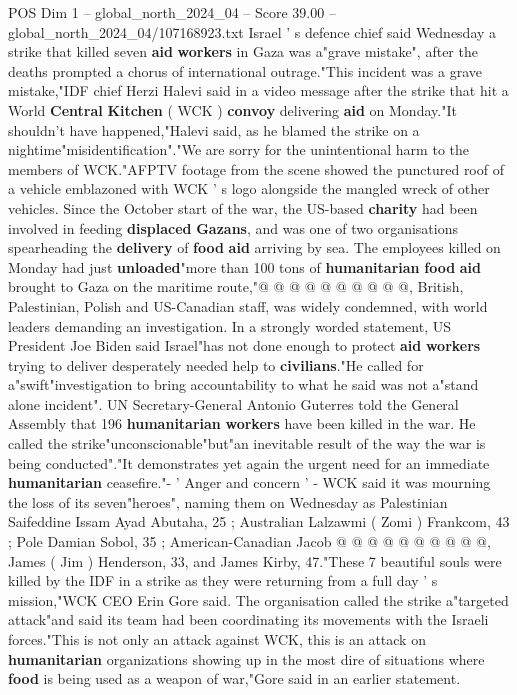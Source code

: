 \begin{textsample}{POS Dim 1 – global\_north\_2024\_04 – Score 39.00 – global\_north\_2024\_04/107168923.txt}  \label{ex:f1_pos_197}
Israel ' s defence chief said Wednesday a strike that killed seven \textbf{aid} \textbf{workers} in Gaza was a"grave mistake", after the deaths prompted a chorus of international outrage."This incident was a grave mistake,"IDF chief Herzi Halevi said in a video message after the strike that hit a World \textbf{Central} \textbf{Kitchen} ( WCK ) \textbf{convoy} delivering \textbf{aid} on Monday."It shouldn't have happened,"Halevi said, as he blamed the strike on a nightime"misidentification"."We are sorry for the unintentional harm to the members of WCK."AFPTV footage from the scene showed the punctured roof of a vehicle emblazoned with WCK ' s logo alongside the mangled wreck of other vehicles.
Since the October start of the war, the US-based \textbf{charity} had been involved in feeding \textbf{displaced} \textbf{Gazans}, and was one of two organisations spearheading the \textbf{delivery} of \textbf{food} \textbf{aid} arriving by sea.
The employees killed on Monday had just \textbf{unloaded}"more than 100 tons of \textbf{humanitarian} \textbf{food} \textbf{aid} brought to Gaza on the maritime route,"@ @ @ @ @ @ @ @ @ @, British, Palestinian, Polish and US-Canadian staff, was widely condemned, with world leaders demanding an investigation.
In a strongly worded statement, US President Joe Biden said Israel"has not done enough to protect \textbf{aid} \textbf{workers} trying to deliver desperately needed help to \textbf{civilians}."He called for a"swift"investigation to bring accountability to what he said was not a"stand alone incident".
UN Secretary-General Antonio Guterres told the General Assembly that 196 \textbf{humanitarian} \textbf{workers} have been killed in the war.
He called the strike"unconscionable"but"an inevitable result of the way the war is being conducted"."It demonstrates yet again the urgent need for an immediate \textbf{humanitarian} ceasefire."- ' Anger and concern ' - WCK said it was mourning the loss of its seven"heroes", naming them on Wednesday as Palestinian Saifeddine Issam Ayad Abutaha, 25 ; Australian Lalzawmi ( Zomi ) Frankcom, 43 ; Pole Damian Sobol, 35 ; American-Canadian Jacob @ @ @ @ @ @ @ @ @ @, James ( Jim ) Henderson, 33, and James Kirby, 47."These 7 beautiful souls were killed by the IDF in a strike as they were returning from a full day ' s mission,"WCK CEO Erin Gore said.
The organisation called the strike a"targeted attack"and said its team had been coordinating its movements with the Israeli forces."This is not only an attack against WCK, this is an attack on \textbf{humanitarian} organizations showing up in the most dire of situations where \textbf{food} is being used as a weapon of war,"Gore said in an earlier statement.

\end{textsample}
